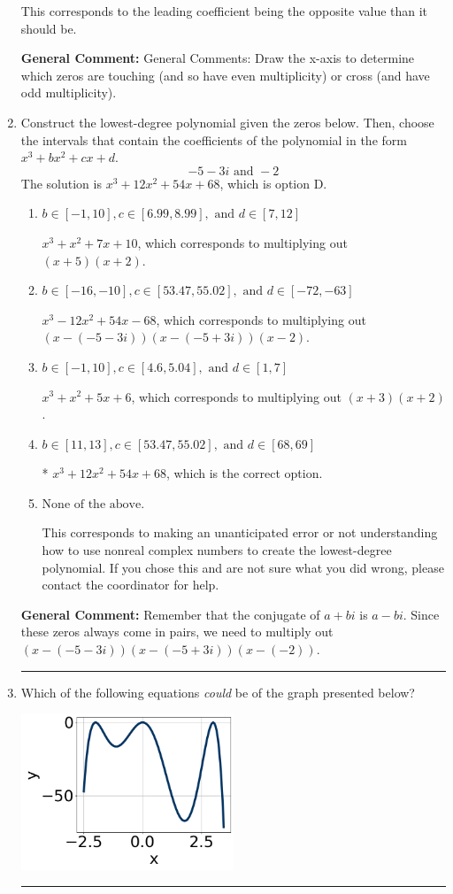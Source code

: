 \documentclass{extbook}[14pt]
\newcommand{\litem}[1]{\item #1

\rule{\textwidth}{0.4pt}}
\begin{document}
\begin{enumerate}
{\begin{enumerate}[label=\Alph*.]
This corresponds to the leading coefficient being the opposite value than it should be.
\end{enumerate}

\textbf{General Comment:} General Comments: Draw the x-axis to determine which zeros are touching (and so have even multiplicity) or cross (and have odd multiplicity).
}
\litem{
Construct the lowest-degree polynomial given the zeros below. Then, choose the intervals that contain the coefficients of the polynomial in the form $x^3+bx^2+cx+d$.
\[ -5 - 3 i \text{ and } -2 \]The solution is \( x^{3} +12 x^{2} +54 x + 68 \), which is option D.\begin{enumerate}[label=\Alph*.]
\item \( b \in [-1, 10], c \in [6.99, 8.99], \text{ and } d \in [7, 12] \)

$x^{3} + x^{2} +7 x + 10$, which corresponds to multiplying out $(x + 5)(x + 2)$.
\item \( b \in [-16, -10], c \in [53.47, 55.02], \text{ and } d \in [-72, -63] \)

$x^{3} -12 x^{2} +54 x -68$, which corresponds to multiplying out $(x-(-5 - 3 i))(x-(-5 + 3 i))(x -2)$.
\item \( b \in [-1, 10], c \in [4.6, 5.04], \text{ and } d \in [1, 7] \)

$x^{3} + x^{2} +5 x + 6$, which corresponds to multiplying out $(x + 3)(x + 2)$.
\item \( b \in [11, 13], c \in [53.47, 55.02], \text{ and } d \in [68, 69] \)

* $x^{3} +12 x^{2} +54 x + 68$, which is the correct option.
\item \( \text{None of the above.} \)

This corresponds to making an unanticipated error or not understanding how to use nonreal complex numbers to create the lowest-degree polynomial. If you chose this and are not sure what you did wrong, please contact the coordinator for help.
\end{enumerate}

\textbf{General Comment:} Remember that the conjugate of $a+bi$ is $a-bi$. Since these zeros always come in pairs, we need to multiply out $(x-(-5 - 3 i))(x-(-5 + 3 i))(x-(-2))$.
}
\litem{
Which of the following equations \textit{could} be of the graph presented below?

\begin{center}
    \includegraphics[width=0.5\textwidth]{../Figures/polyGraphToFunctionC.png}
\end{center}


}
\end{enumerate}
\end{document}
